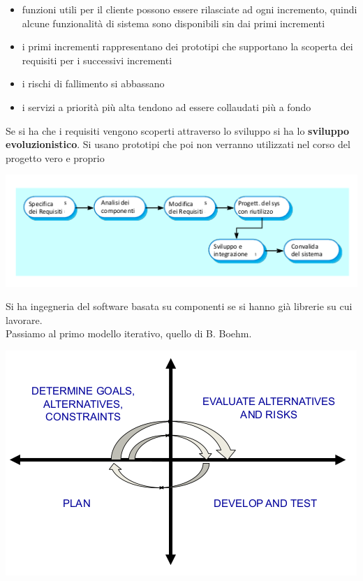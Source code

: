 \documentclass[a4paper,12pt, oneside]{book}
\begin{document}
\begin{itemize}
\item funzioni utili per il cliente possono essere rilasciate ad ogni incremento, quindi alcune funzionalità di sistema sono disponibili sin dai primi incrementi
\item i primi incrementi rappresentano dei prototipi che supportano la scoperta dei requisiti per i successivi incrementi
\item i rischi di fallimento si abbassano
\item i servizi a priorità più alta tendono ad essere collaudati più a fondo
\end{itemize}
Se si ha che i requisiti vengono scoperti attraverso lo sviluppo si ha lo \textbf{sviluppo evoluzionistico}. Si usano prototipi che poi non verranno utilizzati nel corso del progetto vero e proprio\\
\begin{center}
\includegraphics[scale=0.7]{img/ms.png}
\end{center}
Si ha ingegneria del software basata su componenti se si hanno già librerie su cui lavorare.\\
Passiamo al primo modello iterativo, quello di B. Boehm.
\begin{center}
\includegraphics[scale=0.7]{img/ms2.png}
\end{center}
\end{document}
